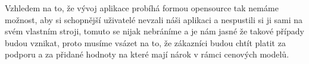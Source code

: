 \par Vzhledem na to, že vývoj aplikace probíhá formou opensource tak nemáme možnost, aby si schopnější uživatelé nevzali náši aplikaci a nespustili si ji sami na svém vlastním stroji, tomuto se nijak nebráníme a je nám jasné že takové případy budou vznikat, proto musíme vsázet na to, že zákazníci budou chtít platit za podporu a za přidané hodnoty na které mají nárok v rámci cenových modelů.